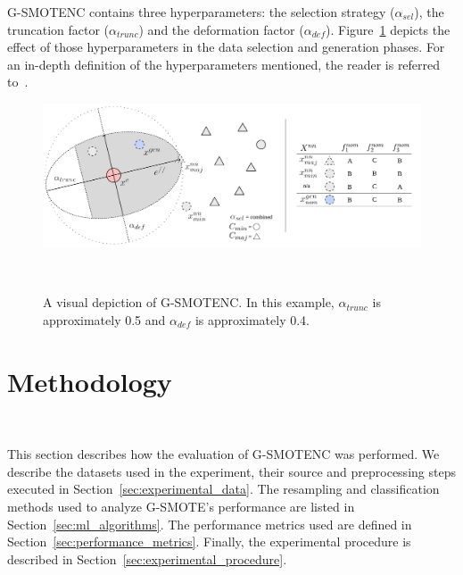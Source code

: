\documentclass[preprint,12pt]{elsarticle}
\begin{document}
{\begin{algorithm}

\end{algorithm}

G-SMOTENC contains three hyperparameters: the selection strategy ($\alpha_{sel}$),
the truncation factor ($\alpha_{trunc}$) and the deformation factor
($\alpha_{def}$). Figure~\ref{fig:gsmote} depicts the effect of those
hyperparameters in the data selection and generation phases. For an in-depth
definition of the hyperparameters mentioned, the reader is referred
to~\cite{douzas2019geometric}.

\begin{figure}
	\centering
	\includegraphics[width=\linewidth]{../analysis/g-smote}
    \caption{A visual depiction of G-SMOTENC. In this example,
        $\alpha_{trunc}$ is approximately 0.5 and $\alpha_{def}$ is
        approximately 0.4.
    }~\label{fig:gsmote}
\end{figure}


\section{Methodology}~\label{sec:methodology}

This section describes how the evaluation of G-SMOTENC was performed. We
describe the datasets used in the experiment, their source and preprocessing
steps executed in Section~\ref{sec:experimental_data}. The resampling and
classification methods used to analyze G-SMOTE's performance are listed in
Section~\ref{sec:ml_algorithms}. The performance metrics used are defined in
Section~\ref{sec:performance_metrics}. Finally, the experimental procedure is
described in Section~\ref{sec:experimental_procedure}.

}
\end{document}
